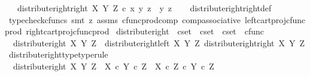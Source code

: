 \begin{isabellebody}
\ \ \ {\isachardoublequoteopen}distribute{\isacharunderscore}{\kern0pt}right{\isacharunderscore}{\kern0pt}right\ X\ Y\ Z\ {\isasymcirc}\isactrlsub c\ {\isasymlangle}{\isasymlangle}x{\isacharcomma}{\kern0pt}\ y{\isasymrangle}{\isacharcomma}{\kern0pt}\ z{\isasymrangle}\ {\isacharequal}{\kern0pt}\ {\isasymlangle}y{\isacharcomma}{\kern0pt}\ z{\isasymrangle}{\isachardoublequoteclose}\isanewline
%
\isadelimproof
\ \ %
\endisadelimproof
%
\isatagproof
{}\isamarkupfalse%
\ distribute{\isacharunderscore}{\kern0pt}right{\isacharunderscore}{\kern0pt}right{\isacharunderscore}{\kern0pt}def\ \ \isanewline
\ \ \isamarkupfalse%
\ {\isacharparenleft}{\kern0pt}typecheck{\isacharunderscore}{\kern0pt}cfuncs{\isacharcomma}{\kern0pt}\ smt\ {\isacharparenleft}{\kern0pt}z{}{\isacharparenright}{\kern0pt}\ assms\ cfunc{\isacharunderscore}{\kern0pt}prod{\isacharunderscore}{\kern0pt}comp\ comp{\isacharunderscore}{\kern0pt}associative{}\ left{\isacharunderscore}{\kern0pt}cart{\isacharunderscore}{\kern0pt}proj{\isacharunderscore}{\kern0pt}cfunc{\isacharunderscore}{\kern0pt}prod\ right{\isacharunderscore}{\kern0pt}cart{\isacharunderscore}{\kern0pt}proj{\isacharunderscore}{\kern0pt}cfunc{\isacharunderscore}{\kern0pt}prod{\isacharparenright}{\kern0pt}%
\endisatagproof
{\isafoldproof}%
%
\isadelimproof
\isanewline
%
\endisadelimproof
\isanewline
{}\isamarkupfalse%
\ distribute{\isacharunderscore}{\kern0pt}right\ {\isacharcolon}{\kern0pt}{\isacharcolon}{\kern0pt}\ {\isachardoublequoteopen}cset\ {\isasymRightarrow}\ cset\ {\isasymRightarrow}\ cset\ {\isasymRightarrow}\ cfunc{\isachardoublequoteclose}\ \isanewline
\ \ {\isachardoublequoteopen}distribute{\isacharunderscore}{\kern0pt}right\ X\ Y\ Z\ {\isacharequal}{\kern0pt}\ {\isasymlangle}distribute{\isacharunderscore}{\kern0pt}right{\isacharunderscore}{\kern0pt}left\ X\ Y\ Z{\isacharcomma}{\kern0pt}\ distribute{\isacharunderscore}{\kern0pt}right{\isacharunderscore}{\kern0pt}right\ X\ Y\ Z{\isasymrangle}{\isachardoublequoteclose}\isanewline
\isanewline
{}\isamarkupfalse%
\ distribute{\isacharunderscore}{\kern0pt}right{\isacharunderscore}{\kern0pt}type{\isacharbrackleft}{\kern0pt}type{\isacharunderscore}{\kern0pt}rule{\isacharbrackright}{\kern0pt}{\isacharcolon}{\kern0pt}\isanewline
\ \ {\isachardoublequoteopen}distribute{\isacharunderscore}{\kern0pt}right\ X\ Y\ Z\ {\isacharcolon}{\kern0pt}\ {\isacharparenleft}{\kern0pt}X\ {\isasymtimes}\isactrlsub c\ Y{\isacharparenright}{\kern0pt}\ {\isasymtimes}\isactrlsub c\ Z\ {\isasymrightarrow}\ {\isacharparenleft}{\kern0pt}X\ {\isasymtimes}\isactrlsub c\ Z{\isacharparenright}{\kern0pt}\ {\isasymtimes}\isactrlsub c\ {\isacharparenleft}{\kern0pt}Y\ {\isasymtimes}\isactrlsub c\ Z{\isacharparenright}{\kern0pt}{\isachardoublequoteclose}\isanewline

\end{isabellebody}
